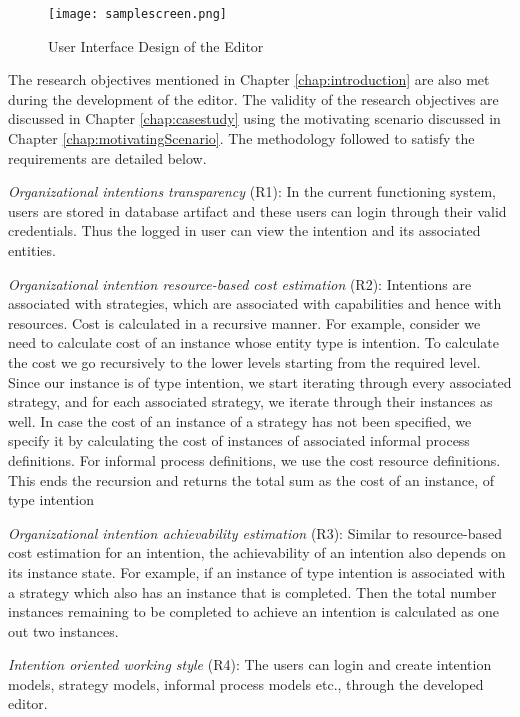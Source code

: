 \begin{figure}
	\centering
	\texttt{[image: samplescreen.png]}
	\caption{User Interface Design of the Editor}
	\label{fig:samplescreen}
\end{figure}

The research objectives mentioned in Chapter \ref{chap:introduction} are also met during the development of the editor. The validity of the research objectives are discussed in Chapter \ref{chap:casestudy} using the motivating scenario discussed in Chapter \ref{chap:motivatingScenario}. The methodology followed to satisfy the requirements are detailed below.

\textit{Organizational intentions transparency} (R1): In the current functioning system, users are stored in database artifact and these users can login through their valid credentials. Thus the logged in user can view the intention and its associated entities.

\textit{Organizational intention resource-based cost estimation} (R2): Intentions are associated with strategies, which are associated with capabilities and hence with resources. Cost is calculated in a recursive manner. For example, consider we need to calculate cost of an instance whose entity type is intention. To calculate the cost we go recursively to the lower levels starting from the required level. Since our instance is of type intention, we start iterating through every associated strategy, and for each associated strategy, we iterate through their instances as well. In case the cost of an instance of a strategy has not been specified, we specify it by calculating the cost of instances of associated informal process definitions. For informal process definitions, we use the cost resource definitions. This ends the recursion and returns the total sum as the cost of an instance, of type intention

\textit{Organizational intention achievability estimation} (R3): Similar to resource-based cost estimation for an intention, the achievability of an intention also depends on its instance state. For example, if an instance of type intention is associated with a strategy which also has an instance that is completed. Then the total number instances remaining to be completed to achieve an intention is calculated as one out two instances. 

\textit{Intention oriented working style} (R4): The users can login and create intention models, strategy models, informal process models etc., through the developed editor. 


